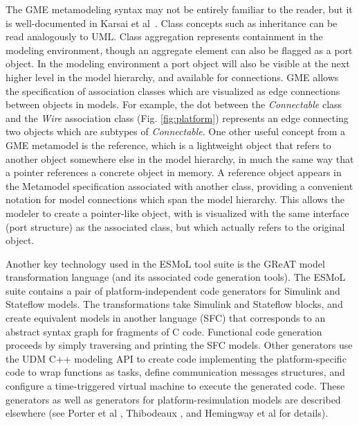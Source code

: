 The GME metamodeling syntax may not be entirely familiar 
to the reader, but it is well-documented in Karsai 
et al~\cite{mic:gme}. Class concepts such as inheritance can be 
read analogously to UML.  Class aggregation represents 
containment in the modeling environment, though an aggregate 
element can also be flagged as a port object.  In the modeling 
environment a port object will also be visible at the next 
higher level in the model hierarchy, and available for 
connections.  GME allows the specification of association classes which are visualized as edge connections between objects in models.  For example, the dot 
between the \emph{Connectable} class and the \emph{Wire} association class 
(Fig. \ref{fig:platform}) represents an edge connecting two objects which are subtypes of \emph{Connectable}.  One other useful 
concept from a GME metamodel is the reference, which is a lightweight object that refers to another object somewhere else in the model hierarchy, in much the same way that a pointer references a concrete object in memory.  A reference
object appears in the Metamodel specification associated with
another class, providing a convenient notation for model connections which span the model hierarchy\cite{mic:gme}. This allows the modeler to create a pointer-like object, 
with is visualized with the same interface (port structure) as the associated
class, but which actually refers to the original object.

Another key technology used in the ESMoL tool suite is 
the GReAT model transformation language (and its associated 
code generation tools)\cite{mic:great}.  The ESMoL suite contains a 
pair of platform-independent code generators for Simulink 
and Stateflow models.  The transformations take Simulink 
and Stateflow blocks, and create equivalent models in 
another language (SFC) that corresponds to an abstract 
syntax graph for fragments of C code.  Functional code 
generation proceeds by simply traversing and printing the SFC 
models. Other generators use the UDM C++ modeling API \cite{mic:udm} to 
create code implementing the 
platform-specific code to wrap functions as tasks, define 
communication messages structures, and configure a 
time-triggered virtual machine to execute the generated code.  
These generators as well as generators for platform-resimulation 
models are described elsewhere (see Porter et al \cite{modeling:esmol}, 
Thibodeaux \cite{timed:frodo}, and Hemingway et al
\cite{modeling:truetime} for details).

